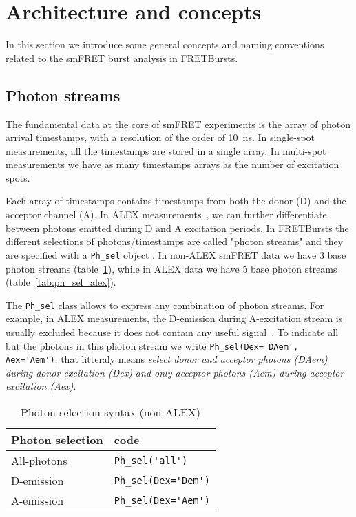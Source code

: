 \section{Architecture and concepts}
\label{sec:concepts}

In this section we introduce some general concepts and naming conventions related 
to the smFRET burst analysis in FRETBursts.

\subsection{Photon streams}
\label{sec:ph_streams}

The fundamental data at the core of smFRET experiments is the array of photon
arrival timestamps, with a resolution of the order of 10~ns. In single-spot
measurements, all the timestamps are stored in a single array. In multi-spot
measurements we have as many timestamps arrays as the number of excitation
spots.

Each array of timestamps contains timestamps from both the donor (D) and the
acceptor channel (A). In ALEX measurements~\cite{Lee_2005}, we can further 
differentiate between
photons emitted during D and A excitation periods. In FRETBursts the different
selections of photons/timestamps are called "photon streams" and they are
specified with a
\href{http://fretbursts.readthedocs.org/en/latest/ph_sel.html}{\texttt{Ph\_sel}
object} . In non-ALEX smFRET data we have 3 base photon streams
(table~\ref{tab:ph_sel_smfret}), while in ALEX data we have 5 base photon
streams (table~\ref{tab:ph_sel_alex}).

The
\href{http://fretbursts.readthedocs.org/en/latest/ph_sel.html}{\texttt{Ph\_sel}
class} allows to express any combination of photon streams. 
For example, in ALEX measurements, the D-emission during A-excitation stream is
usually excluded because it does not contain any useful signal~\cite{Lee_2005}.
To indicate all but the photons in this photon stream we write
\verb|Ph_sel(Dex='DAem', Aex='Aem')|, that litteraly means \textit{select donor
and acceptor photons (DAem) during donor excitation (Dex) and only acceptor
photons (Aem) during acceptor excitation (Aex)}.

\begin{table}
\begin{tabular}{l|l}
  Photon selection  & code \\
  \hline
  All-photons       & \verb|Ph_sel('all')|\\
  D-emission    & \verb|Ph_sel(Dex='Dem')|\\
  A-emission & \verb|Ph_sel(Dex='Aem')|\\
\end{tabular}
\caption{\label{tab:ph_sel_smfret}Photon selection syntax (non-ALEX)}
\end{table}

